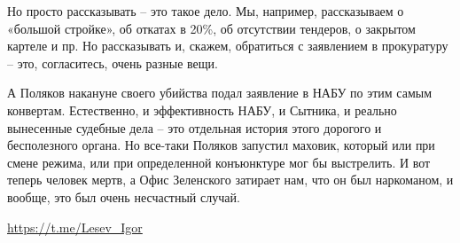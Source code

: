 Но просто рассказывать – это такое дело. Мы, например, рассказываем о «большой
стройке», об откатах в 20\%, об отсутствии тендеров, о закрытом картеле и пр. Но
рассказывать и, скажем, обратиться с заявлением в прокуратуру – это,
согласитесь, очень разные вещи.

А Поляков накануне своего убийства подал заявление в НАБУ по этим самым
конвертам. Естественно, и эффективность НАБУ, и Сытника, и реально вынесенные
судебные дела – это отдельная история этого дорогого и бесполезного органа. Но
все-таки Поляков запустил маховик, который или при смене режима, или при
определенной конъюнктуре мог бы выстрелить. И вот теперь человек мертв, а Офис
Зеленского затирает нам, что он был наркоманом, и вообще, это был очень
несчастный случай.

\url{https://t.me/Lesev_Igor}
